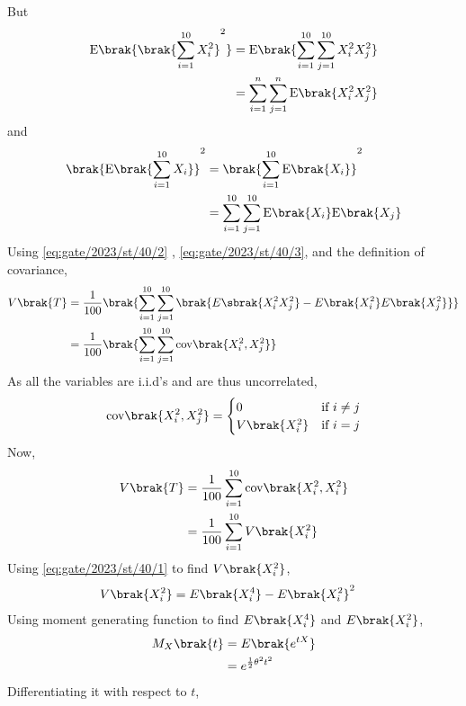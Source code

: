 \documentclass[journal,12pt,onecolumn]{IEEEtran}
\theoremstyle{remark}
\begin{document}
But
\begin{align}
    \text{E}\brak{\brak{\sum_{i=1}^{10} X_i^2}^2} &= \text{E}\brak{\sum_{i=1}^{10} \sum_{j=1}^{10} X_i^2X_j^2}\\
    &= \sum_{i=1}^{n} \sum_{j=1}^{n} \text{E}\brak{X_i^2X_j^2} \label{eq:gate/2023/st/40/2}
\end{align}
and 
\begin{align}
    \brak{\text{E}\brak{\sum_{i=1}^{10} X_i}}^2 &= \brak{\sum_{i=1}^{10} \text{E}\brak{X_i}}^2\\
    &= \sum_{i=1}^{10} \sum_{j=1}^{10} \text{E}\brak{X_i} \text{E}\brak{X_j} \label{eq:gate/2023/st/40/3}
\end{align}
Using \eqref{eq:gate/2023/st/40/2} , \eqref{eq:gate/2023/st/40/3}, and the definition of covariance,
\begin{align}
	V\brak{T} &= \frac{1}{100} \brak{\sum_{i=1}^{10} \sum_{j=1}^{10} \brak{E\sbrak{X_i^2X_j^2} - E\brak{X_i^2} E\brak{X_j^2}}}\\
    &= \frac{1}{100} \brak{\sum_{i=1}^{10} \sum_{j=1}^{10} \text{cov}\brak{X_i^2, X_j^2}}
\end{align}
As all the variables are i.i.d's and are thus uncorrelated,
\begin{align}
    \text{cov}\brak{X_i^2, X_j^2} = 
    \begin{cases}
        0 & \text{if } i \ne j\\
        V\brak{X_i^2} & \text{if } i = j
    \end{cases}
\end{align}
Now,
\begin{align}
	V\brak{T} &= \frac{1}{100}\sum^{10}_{i=1}{\text{cov}\brak{X_i^2,X_i^2}}\\
	&= \frac{1}{100}\sum^{10}_{i=1}{V\brak{X^2_i}}
\end{align}
Using \eqref{eq:gate/2023/st/40/1} to find $V\brak{X_i^2}$,
\begin{align}
	V\brak{X^2_i} &= E\brak{X^4_i} - E\brak{X^2_i}^2
\end{align}
Using moment generating function to find $E\brak{X_i^4}$ and $E\brak{X_i^2}$,
\begin{align}
	M_X\brak{t} &= E\brak{e^{tX}}\\
	&= e^{\frac{1}{2}\theta^2t^2}
\end{align}
Differentiating it with respect to $t$,
\end{document}
